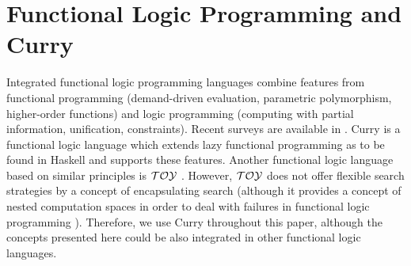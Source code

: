 \documentclass[english]{lni}
\begin{document}
\section{Functional Logic Programming and Curry}

Integrated functional logic programming languages
combine features 
from functional programming (demand-driven evaluation, parametric
polymorphism, higher-order functions) and logic programming
(computing with partial information, unification, constraints).
Recent surveys are available in \cite{AntoyHanus10CACM,Hanus07ICLP}.
Curry \cite{Hanus06Curry} is a functional logic language
which extends lazy functional programming as to be found in
Haskell \cite{PeytonJones03Haskell} and supports these features.
Another functional logic language based on similar principles is
${\cal TOY}$ \cite{Lopez-FraguasSanchez-Hernandez99}.
However, ${\cal TOY}$ does not offer flexible search strategies
by a concept of encapsulating search
(although it provides a concept of nested computation spaces
in order to deal with failures in functional logic
programming \cite{LopezSanchez04,SanchezHernandez06}).
Therefore, we use Curry throughout this paper, although
the concepts presented here could be also integrated in
other functional logic languages.
\end{document}
